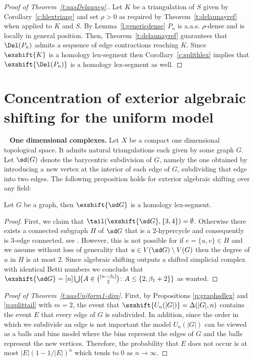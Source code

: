 %
\begin{proof}[Proof of Theorem~\ref{t:aasDelauney}.]
  Let $K$ be a triangulation of $S$ given by Corollary~\ref{c:hlextriang} and set $\rho > 0$ as required by Theorem~\ref{t:delaunayref} when applied to $K$ and $S$.
  By Lemma~\ref{l:genericdense} $P_n$ is a.a.s. $\rho$-dense and is locally in general position. Then, Theorem~\ref{t:delaunayref} guarantees that $\Del(P_n)$ admits a sequence of edge contractions reaching $K$. Since $\exshift{K}$ is a homology lex-segment then Corollary~\ref{c:splithlex} implies that $\exshift{\Del(P_n)}$ is a homology lex-segment as well.
\end{proof}
%
%
%
\section{Concentration of exterior algebraic shifting for the uniform model}~\label{sec:ass1dim}
\noindent
{\bf One dimensional complexes.}
Let $X$ be a compact one dimensional topological space.
It admits natural triangulations each given by some graph $G$. Let $\sd(G)$ denote the barycentric subdivision of $G$, namely the one obtained by introducing a new vertex at the interior of each edge of $G$, subdividing that edge into two edges.
The following proposition holds for exterior algebraic shifting over any field:
\begin{proposition}
    \label{p:graphsdlex}
    Let $G$ be a graph, then $\exshift{\sd G}$ is a homology lex-segment.
\end{proposition}
\begin{proof}
    First, we claim that $\tail(\exshift{\sd G},\{3,4\}) = \emptyset$. Otherwise there exists a connected subgraph $H$ of $\sd G$ that is a $2$-hypercycle and consequently is $3$-edge connected, see \cite[Theorem 5.4]{kalai85-hyperconnectivity}. However, this is not possible for if $e=\{u,v\}\in H$ and we assume without loss of generality that $u \in V(\sd G)\setminus V(G)$ then the degree of $u$ in $H$ is at most $2$.
    Since algebraic shifting outputs a shifted simplicial complex with identical Betti numbers we conclude that $\exshift{\sd G} = [n]\bigcup \{A\in \binom{[n-\beta_0]}{2}\colon A \leq \{2,\beta_1+2\}\}$ as wanted.
    \end{proof}
%
\begin{proof}[Proof of Theorem~\ref{t:aasUniform1-dim}]
    First, by Propositions \ref{p:graphsdlex} and \ref{p:splittail} with $m=2$, the event that $\exshift{U_n(|G|)}=\Delta(|G|,n)$ contains the event $E$  that every edge of $G$ is subdivided. 
    In addition, since the order in which we subdivide an edge is not important the model $U_n(|G|)$ can be viewed as a balls and bins model where the bins represent the edges of $G$ and the balls represent the new vertices. Therefore, the probability that $E$ does not occur is at most $|E|(1-1/|E|)^n$ which tends to $0$ as $n\to\infty.$
\end{proof}
